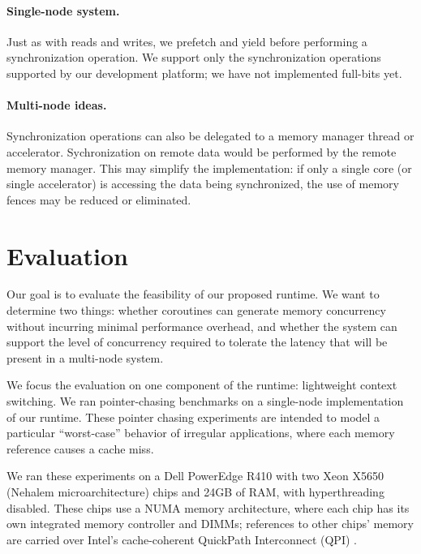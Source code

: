 \documentclass[10pt,nocopyrightspace,preprint]{sigplanconf}
\begin{document}
\paragraph{Single-node system.}
Just as with reads and writes, we prefetch and yield before performing
a synchronization operation. We support only the synchronization
operations supported by our development platform; we have not
implemented full-bits yet.

\paragraph{Multi-node ideas.}
Synchronization operations can also be delegated to a memory manager
thread or accelerator. Sychronization on remote data would be
performed by the remote memory manager. This may simplify the
implementation: if only a single core (or single accelerator) is
accessing the data being synchronized, the use of memory fences may be
reduced or eliminated.


\section{Evaluation}
\label{sec:evaluation}

Our goal is to evaluate the feasibility of our proposed runtime. We want to determine two things: whether coroutines can generate memory concurrency without incurring minimal performance overhead, and whether the system can support the level of concurrency required to tolerate the latency that will be present in a multi-node system.

We focus the evaluation on one component of the runtime: lightweight context switching. We ran pointer-chasing benchmarks on a single-node implementation of our runtime. These pointer chasing experiments are intended to model a particular ``worst-case'' behavior of irregular applications, where each memory reference causes a cache miss.

We ran these experiments on a Dell PowerEdge R410 with two Xeon X5650 (Nehalem microarchitecture)
chips and 24GB of RAM, with hyperthreading disabled. These
chips use a NUMA memory architecture, where each chip has
its own integrated memory controller and DIMMs; references to other
chips' memory are carried over Intel's cache-coherent QuickPath
Interconnect (QPI) \cite{quickpath:website}.
\end{document}
